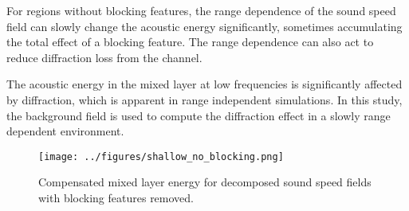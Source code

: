 \documentclass[preprint,NumberedRefs]{JASA}
\begin{document}
For regions without blocking features, the range dependence of the sound speed field can slowly change the acoustic energy significantly, sometimes accumulating the total effect of a blocking feature. The range dependence can also act to reduce diffraction loss from the channel.

The acoustic energy in the mixed layer at low frequencies is significantly affected by diffraction, which is apparent in range independent simulations. In this study, the background field is used to compute the diffraction effect in a slowly range dependent environment.

\begin{figure}
\texttt{[image: ../figures/shallow\_no\_blocking.png]}
    \caption{Compensated mixed layer energy for decomposed sound speed fields with blocking features removed.}
    \label{fig:shal_no_block}
\end{figure}




\end{document}
